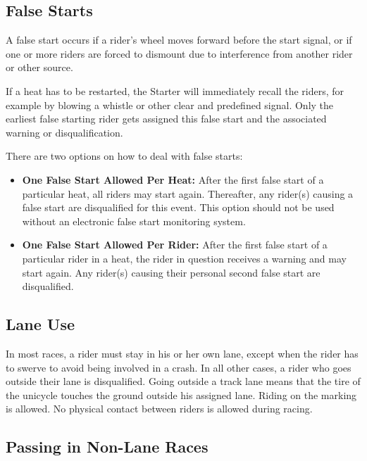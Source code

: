 \subsection{False Starts \label{subsec:track_false-starts}}

A false start occurs if a rider's wheel moves forward before the start signal, or if one or more riders are forced to dismount due to interference from another rider or other source.

If a heat has to be restarted, the Starter will immediately recall the riders, for example by blowing a whistle or other clear and predefined signal.
Only the earliest false starting rider gets assigned this false start and the associated warning or disqualification.

There are two options on how to deal with false starts:
\begin{itemize}

\item \textbf{One False Start Allowed Per Heat:}
After the first false start of a particular heat, all riders may start again.
Thereafter, any rider(s) causing a false start are disqualified for this event.
This option should not be used without an electronic false start monitoring system.
\item \textbf{One False Start Allowed Per Rider:}
After the first false start of a particular rider in a heat, the rider in question receives a warning and may start again.
Any rider(s) causing their personal second false start are disqualified.
\end{itemize}

\subsection{Lane Use}

In most races, a rider must stay in his or her own lane, except when the rider has to swerve to avoid being involved in a crash.
In all other cases, a rider who goes outside their lane is disqualified.
Going outside a track lane means that the tire of the unicycle touches the ground outside his assigned lane.
Riding on the marking is allowed.
No physical contact between riders is allowed during racing.

\subsection{Passing in Non-Lane Races \label{subsec:track_lane-use_non-lane-races}}

